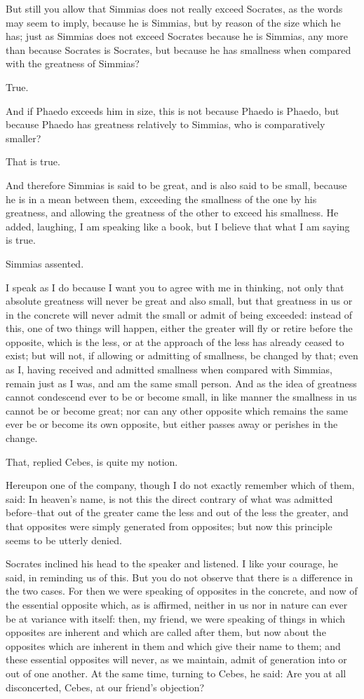 But still you allow that Simmias does not really exceed Socrates, as
the words may seem to imply, because he is Simmias, but by reason of the
size which he has; just as Simmias does not exceed Socrates because he
is Simmias, any more than because Socrates is Socrates, but because he
has smallness when compared with the greatness of Simmias?

True.

And if Phaedo exceeds him in size, this is not because Phaedo is
Phaedo, but because Phaedo has greatness relatively to Simmias, who is
comparatively smaller?

That is true.

And therefore Simmias is said to be great, and is also said to be small,
because he is in a mean between them, exceeding the smallness of the one
by his greatness, and allowing the greatness of the other to exceed his
smallness. He added, laughing, I am speaking like a book, but I believe
that what I am saying is true.

Simmias assented.

I speak as I do because I want you to agree with me in thinking, not
only that absolute greatness will never be great and also small, but
that greatness in us or in the concrete will never admit the small or
admit of being exceeded: instead of this, one of two things will happen,
either the greater will fly or retire before the opposite, which is the
less, or at the approach of the less has already ceased to exist; but
will not, if allowing or admitting of smallness, be changed by that;
even as I, having received and admitted smallness when compared with
Simmias, remain just as I was, and am the same small person. And as the
idea of greatness cannot condescend ever to be or become small, in like
manner the smallness in us cannot be or become great; nor can any other
opposite which remains the same ever be or become its own opposite, but
either passes away or perishes in the change.

That, replied Cebes, is quite my notion.

Hereupon one of the company, though I do not exactly remember which of
them, said: In heaven's name, is not this the direct contrary of what
was admitted before--that out of the greater came the less and out of
the less the greater, and that opposites were simply generated from
opposites; but now this principle seems to be utterly denied.

Socrates inclined his head to the speaker and listened. I like your
courage, he said, in reminding us of this. But you do not observe that
there is a difference in the two cases. For then we were speaking of
opposites in the concrete, and now of the essential opposite which, as
is affirmed, neither in us nor in nature can ever be at variance with
itself: then, my friend, we were speaking of things in which opposites
are inherent and which are called after them, but now about the
opposites which are inherent in them and which give their name to them;
and these essential opposites will never, as we maintain, admit of
generation into or out of one another. At the same time, turning to
Cebes, he said: Are you at all disconcerted, Cebes, at our friend's
objection?

